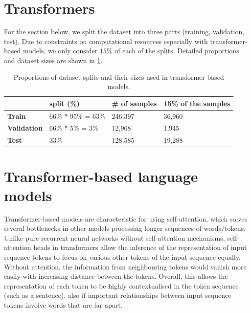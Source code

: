 \section*{\large Transformers}\label{sec:transformers}
\setcounter{section}{0}

For the section below, we split the dataset into three parts (training, validation, test). Due to constraints on computational resources especially with transformer-based models, we only consider $15\%$ of each of the splits. Detailed proportions and dataset sizes are shown in \cref{tab:p2t-dataset-splits}.

\begin{table}
\centering
\begin{tabular}{l|l|l|l|}
 & \textbf{split (\%)} & \textbf{\# of samples} & \textbf{15\% of the samples} \\ \hline
\textbf{Train} & 66\% * 95\% = 63\% & 246,397 & 36,960 \\ \hline
\textbf{Validation} & 66\% * 5\% = 3\% & 12,968 & 1,945 \\ \hline
\textbf{Test} & 33\% & 128,585 & 19,288 \\ \hline
\end{tabular}
\caption{Proportions of dataset splits and their sizes used in transformer-based models.}
\label{tab:p2t-dataset-splits}
\end{table}

\section{Transformer-based language models}

Transformer-based models are characteristic for using self-attention, which solves several bottlenecks in other models processing longer sequences of words/tokens. Unlike pure recurrent neural networks without self-attention mechanisms, self-attention heads in transformers allow the inference of the representation of input sequence tokens to focus on various other tokens of the input sequence equally. Without attention, the information from neighbouring tokens would vanish more easily with increasing distance between the tokens. Overall, this allows the representation of each token to be highly contextualised in the token sequence (such as a sentence), also if important relationships between input sequence tokens involve words that are far apart.

